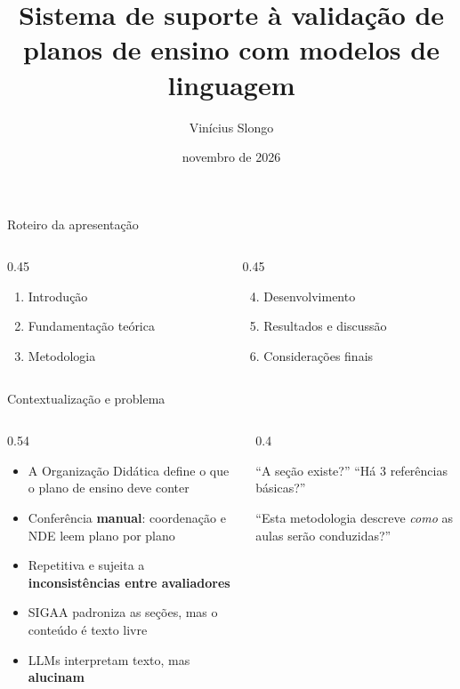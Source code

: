 \documentclass[aspectratio=169,11pt,xcolor=table]{beamer}
\title{Sistema de suporte à validação de planos de ensino com modelos de linguagem}
\author{Vinícius Slongo}
\date{novembro de 2026}
\begin{document}
\capa

\begin{frame}{Roteiro da apresentação}
  \begin{columns}[T]
    \begin{column}{0.45\textwidth}
      \begin{enumerate}\setlength\itemsep{1.2em}
        \item Introdução
        \item Fundamentação teórica
        \item Metodologia
      \end{enumerate}
    \end{column}
    \begin{column}{0.45\textwidth}
      \begin{enumerate}\setcounter{enumi}{3}\setlength\itemsep{1.2em}
        \item Desenvolvimento
        \item Resultados e discussão
        \item Considerações finais
      \end{enumerate}
    \end{column}
  \end{columns}
\end{frame}


\begin{frame}{Contextualização e problema}
  \begin{columns}[T]
    \begin{column}{0.54\textwidth}
      \begin{itemize}\small\setlength\itemsep{0.45em}
        \item A Organização Didática define o que o plano de ensino deve conter \cite{ifc2022}
        \item Conferência \textbf{manual}: coordenação e NDE leem plano por plano
        \item Repetitiva e sujeita a \textbf{inconsistências entre avaliadores}
        \item SIGAA padroniza as seções, mas o conteúdo é texto livre
        \item LLMs interpretam texto, mas \textbf{alucinam} \cite{Ji2023}
      \end{itemize}
    \end{column}
    \begin{column}{0.4\textwidth}
      \begin{cartao}[title={Regras fixas resolvem\ldots}]
        \small ``A seção existe?'' \quad ``Há 3 referências básicas?''
      \end{cartao}
      \medskip
      \begin{cartao}[title={\ldots mas não julgam}]
        \small ``Esta metodologia descreve \emph{como} as aulas serão conduzidas?''
      \end{cartao}
    \end{column}
  \end{columns}
\end{frame}
\end{document}
